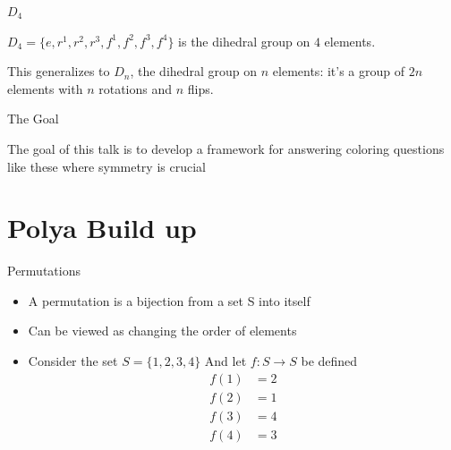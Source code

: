 \documentclass{beamer}
\begin{document}
\begin{frame}{$D_4$}
\begin{center}

	\end{center}
	$D_4=\{e,r^1,r^2,r^3,f^1,f^2,f^3,f^4\}$ is the dihedral group on $4$ elements.

	This generalizes to $D_n$, the dihedral group on $n$ elements: it's a group of $2n$ elements with $n$ rotations and $n$ flips.
\end{frame}

\begin{frame}{The Goal}

    The goal of this talk is to develop a framework for
    answering coloring questions like these where symmetry
    is crucial
\end{frame}

\section{Polya Build up}

\begin{frame}{Permutations}
	\begin{itemize}
	\item A permutation is a bijection from a set S into itself
    \item Can be viewed as changing the order of elements
    \item Consider the set $S = \{1,2,3,4\}$ And let $f : S \to S$ be defined
    \begin{align*}
    	f(1) &= 2 \\
        f(2) &= 1 \\
        f(3) &= 4 \\
        f(4) &= 3 \\
    \end{align*}
	\end{itemize}
\end{frame}
\end{document}
